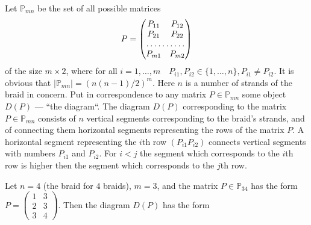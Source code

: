 \documentclass[12pt, a4paper, titlepage]{article}
\begin{document}
Let $\mathbb{P}_{mn}$ be the set of all possible matrices
\begin{equation}\nonumber
P=
\begin{pmatrix}
    P_{11} & P_{12}\\
    P_{21} & P_{22}\\
    \hdotsfor{2}\\
    P_{m1} & P_{m2}
\end{pmatrix}
\end{equation}
of the size $m\times 2$, where for all 
$i=1,\ldots, m \quad P_{i1}, P_{i2} \in\{1,\ldots,n\}, P_{i1}\ne P_{i2}$.
It is obvious that $|\mathbb{P}_{mn}|=(n(n-1)/2)^m$. 
Here $n$ is a number of strands of the braid in concern. 
Put in correspondence to any matrix $P\in\mathbb{P}_{mn}$ some object $D(P)$
--- ``the diagram``. 
The diagram $D(P)$ corresponding to the matrix $P\in \mathbb{P}_{mn}$ consists of $n$ 
vertical segments corresponding to the braid's strands, 
and of connecting them horizontal segments representing the rows of the matrix $P$. 
A horizontal segment representing the $i$th row $(P_{i1} P_{i2})$ connects 
vertical segments with numbers $P_{i1}$ and $P_{i2}$. 
For $i<j$ the segment which corresponds to the $i$th row is higher 
then the segment which corresponds to the $j$th row.

\begin{example}
 Let $n=4$ (the braid for $4$ braids), $m=3$, and the matrix $P\in\mathbb{P}_{34}$ has the form
$P=\begin{pmatrix}1 & 3\\2 & 3\\ 3 & 4\end{pmatrix}$.
Then the diagram $D(P)$ has the form
\begin{center}
\end{center}
\end{example}
\end{document}

